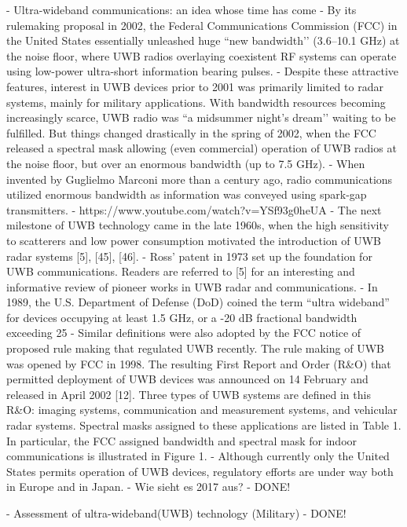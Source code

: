 \cite{yang2004uwbcom}
	- Ultra-wideband communications: an idea whose time has come
	- By its rulemaking proposal in 2002, the Federal Communications Commission (FCC) in the United States essentially unleashed huge “new bandwidth’’ (3.6–10.1 GHz) at the noise floor, where UWB radios overlaying coexistent RF systems can operate using low-power ultra-short information bearing pulses.
	- Despite these attractive features, interest in UWB devices prior to 2001 was primarily limited to radar systems, mainly for military applications. With bandwidth resources becoming increasingly scarce, UWB radio was “a midsummer night’s dream’’ waiting to be fulfilled. But things changed drastically in the spring of 2002, when the FCC released a spectral mask allowing (even commercial) operation of UWB radios at the noise floor, but over an enormous bandwidth (up to 7.5 GHz).
	- When invented by Guglielmo Marconi more than a century ago, radio communications utilized enormous bandwidth as information was conveyed using spark-gap transmitters.
			- https://www.youtube.com/watch?v=YSf93g0heUA
	- The next milestone of UWB technology came in the late 1960s, when the high sensitivity to scatterers and low power consumption motivated the introduction of UWB radar systems [5], [45], [46].
	- Ross’ patent in 1973 set up the foundation for UWB communications. Readers are referred to [5] for an interesting and informative review of pioneer works in UWB radar and communications.
	- In 1989, the U.S. Department of Defense (DoD) coined the term “ultra wideband” for devices occupying at least 1.5 GHz, or a -20 dB fractional bandwidth exceeding 25%
	- Similar definitions were also adopted by the FCC notice of proposed rule making that regulated UWB recently. The rule making of UWB was opened by FCC in 1998. The resulting First Report and Order (R\&O) that permitted deployment of UWB devices was announced on 14 February and released in April 2002 [12]. Three types of UWB systems are defined in this R\&O: imaging systems, communication and measurement systems, and vehicular radar systems. Spectral masks assigned to these applications are listed in Table 1. In particular, the FCC assigned bandwidth and spectral mask for indoor communications is illustrated in Figure 1.
	- Although currently only the United States permits operation of UWB devices, regulatory efforts are under way both in Europe and in Japan.
		- Wie sieht es 2017 aus?
	- DONE!
	
\cite{fowler1990assessment}
	- Assessment of ultra-wideband(UWB) technology (Military)
	- DONE!
	
